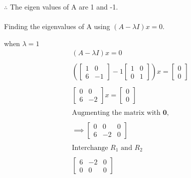 \documentclass[12pt, a4paper]{article}
\begin{document}
$\therefore$ The eigen values of A are 1 and -1. \\ \\
Finding the eigenvalues of A using $(A - \lambda I)x = 0$.
\begin{center}
    when $\lambda = 1$ \\
    \begin{align*}
        (A - \lambda I)x = 0 \\ \\
        \left(\begin{bmatrix}
            1 & 0 \\
            6 & -1
        \end{bmatrix} - 1 \begin{bmatrix}
            1 & 0 \\
            0 & 1
        \end{bmatrix}\right)x = \begin{bmatrix}
            0 \\
            0
        \end{bmatrix} \\ \\
        \begin{bmatrix}
            0 & 0 \\
            6 & -2
        \end{bmatrix}x = \begin{bmatrix}
            0 \\
            0
        \end{bmatrix} \\ \\
        \text{Augmenting the matrix with } \boldsymbol{0}, \\ \\
        \implies \begin{bmatrix}
            0 & 0 & 0 \\
            6 & -2 & 0
        \end{bmatrix} \\ \\
        \text{Interchange } R_1 \text{ and } R_2 \\ \\
        \begin{bmatrix}
            6 & -2 & 0 \\
            0 & 0 & 0
        \end{bmatrix}
    \end{align*}

    \newpage


\end{center}
\end{document}
